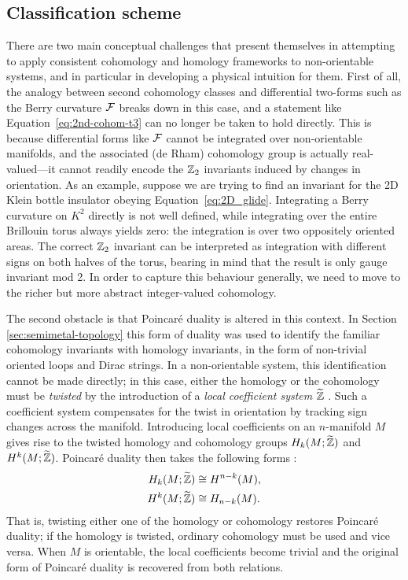 \subsection{Classification scheme}

There are two main conceptual challenges that present themselves in attempting to apply consistent cohomology and homology frameworks to non-orientable systems, and in particular in developing a physical intuition for them. First of all, the analogy between second cohomology classes and differential two-forms such as the Berry curvature $\mathcal{F}$ breaks down in this case, and a statement like Equation~\eqref{eq:2nd-cohom-t3} can no longer be taken to hold directly. %
This is because differential forms like $\mathcal{F}$ cannot be integrated over non-orientable manifolds, and the associated (de Rham) cohomology group is actually real-valued---it cannot readily encode the $\mathbb{Z}_2$ invariants induced by changes in orientation. As an example, suppose we are trying to find an invariant for the 2D Klein bottle insulator obeying Equation~\eqref{eq:2D_glide}. Integrating a Berry curvature on $K^2$ directly is not well defined, while integrating over the entire Brillouin torus always yields zero: the integration is over two oppositely oriented areas. The correct $\mathbb{Z}_2$ invariant can be interpreted as integration with different signs on both halves of the torus, bearing in mind that the result is only gauge invariant mod 2. In order to capture this behaviour generally, we need to move to the richer but more abstract integer-valued cohomology.  %

The second obstacle is that Poincaré duality is altered in this context. In Section \ref{sec:semimetal-topology} this form of duality was used to identify the familiar cohomology invariants with homology invariants, in the form of non-trivial oriented loops and Dirac strings. In a non-orientable system, this identification cannot be made directly; in this case, either the homology or the cohomology must be \emph{twisted} by the introduction of a \emph{local coefficient system} $\widetilde{\mathbb{Z}}$ \cite{Whitehead_Homotopy,Hatcher_algebraic-topology}. Such a coefficient system compensates for the twist in orientation by tracking sign changes across the manifold. Introducing local coefficients on an $n$-manifold $M$ gives rise to the twisted homology and cohomology groups $H_k(M;\widetilde{\mathbb{Z}})$ and $H^k(M;\widetilde{\mathbb{Z}})$. Poincaré duality then takes the following forms \parencite[Thm. 3H.6]{Hatcher_algebraic-topology}:
\begin{align*}
	H_k(M;\widetilde{\mathbb{Z}}) &\cong H^{n-k}(M), \\
	H^k(M;\widetilde{\mathbb{Z}}) &\cong H_{n-k}(M).
\end{align*}
That is, twisting either one of the homology or cohomology restores Poincaré duality; if the homology is twisted, ordinary cohomology must be used and vice versa. When $M$ is orientable, the local coefficients become trivial and the original form of Poincaré duality is recovered from both relations.

